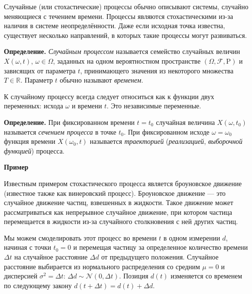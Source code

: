\documentclass[11pt,a4paper]{article}
\begin{document}
Случайные (или стохастические) процессы обычно описывают системы,
случайно меняющиеся с течением времени. Процессы являются
стохастическими из-за наличия в системе неопределённости. Даже если
исходная точка известна, существует несколько направлений, в которых
такие процессы могут развиваться.

    \textbf{Определение.} \emph{Случайным процессом} называется семейство
случайных величин \(X(\omega, t)\), \(\omega \in \Omega\), заданных на
одном вероятностном пространстве \((\Omega, \mathcal{F}, \mathrm{P})\) и
зависящих от параметра \(t\), принимающего значения из некоторого
множества \(T \in \mathbb{R}\). Параметр \(t\) обычно называют
\emph{временем}.

К случайному процессу всегда следует относиться как к функции двух
переменных: исхода \(\omega\) и времени \(t\). Это независимые
переменные.

\textbf{Определение.} При фиксированном времени \(t = t_0\) случайная
величина \(X(\omega, t_0)\) называется \emph{сечением процесса} в точке
\(t_0\). При фиксированном исходе \(\omega = \omega_0\) функция времени
\(X(\omega_0, t)\) называется \emph{траекторией} (\emph{реализацией},
\emph{выборочной функцией}) процесса.

    \textbf{Пример}

Известным примером стохастического процесса является броуновское
движение (известное также как винеровский процесс). Броуновское движение
--- это случайное движение частиц, взвешенных в жидкости. Такое движение
может рассматриваться как непрерывное случайное движение, при котором
частица перемещается в жидкости из-за случайного столкновения с ней
других частиц.

Мы можем смоделировать этот процесс во времени \(t\) в одном измерении
\(d\), начиная с точки \(t_0 = 0\) и перемещая частицу за определенное
количество времени \(\Delta t\) на случайное расстояние \(\Delta d\) от
предыдущего положения. Случайное расстояние выбирается из нормального
распределения со средним \(\mu = 0\) и дисперсией
\(\sigma^2 = \Delta t\): \(\Delta d \sim \mathcal{N}(0, \Delta t)\).
Позиция \(d(t)\) изменяется со временем по следующему закону
\(d(t + \Delta t) = d(t) + \Delta d\).
\end{document}
